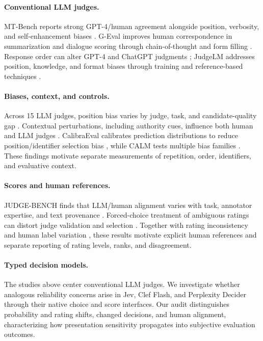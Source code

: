 \documentclass[11pt]{article}
\begin{document}
\paragraph{Conventional LLM judges.}
MT-Bench reports strong GPT-4/human agreement alongside position, verbosity, and self-enhancement biases \citep{zheng2023judging}. G-Eval improves human correspondence in summarization and dialogue scoring through chain-of-thought and form filling \citep{liu-etal-2023-g}. Response order can alter GPT-4 and ChatGPT judgments \citep{wang-etal-2024-large-language-models-fair}; JudgeLM addresses position, knowledge, and format biases through training and reference-based techniques \citep{zhu2025judgelm}.

\paragraph{Biases, context, and controls.}
Across 15 LLM judges, position bias varies by judge, task, and candidate-quality gap \citep{shi-etal-2025-judging}. Contextual perturbations, including authority cues, influence both human and LLM judges \citep{chen-etal-2024-humans}. CalibraEval calibrates prediction distributions to reduce position/identifier selection bias \citep{li-etal-2025-calibraeval}, while CALM tests multiple bias families \citep{ICLR2025_fdca08d3}. These findings motivate separate measurements of repetition, order, identifiers, and evaluative context.

\paragraph{Scores and human references.}
JUDGE-BENCH finds that LLM/human alignment varies with task, annotator expertise, and text provenance \citep{bavaresco-etal-2025-llms}. Forced-choice treatment of ambiguous ratings can distort judge validation and selection \citep{guerdan2025indeterminacy}. Together with rating inconsistency \citep{stureborg2024} and human label variation \citep{plank-2022-problem}, these results motivate explicit human references and separate reporting of rating levels, ranks, and disagreement.

\paragraph{Typed decision models.}
The studies above center conventional LLM judges. We investigate whether analogous reliability concerns arise in Jev, Clef Flash, and Perplexity Decider through their native choice and score interfaces. Our audit distinguishes probability and rating shifts, changed decisions, and human alignment, characterizing how presentation sensitivity propagates into subjective evaluation outcomes.
\end{document}
